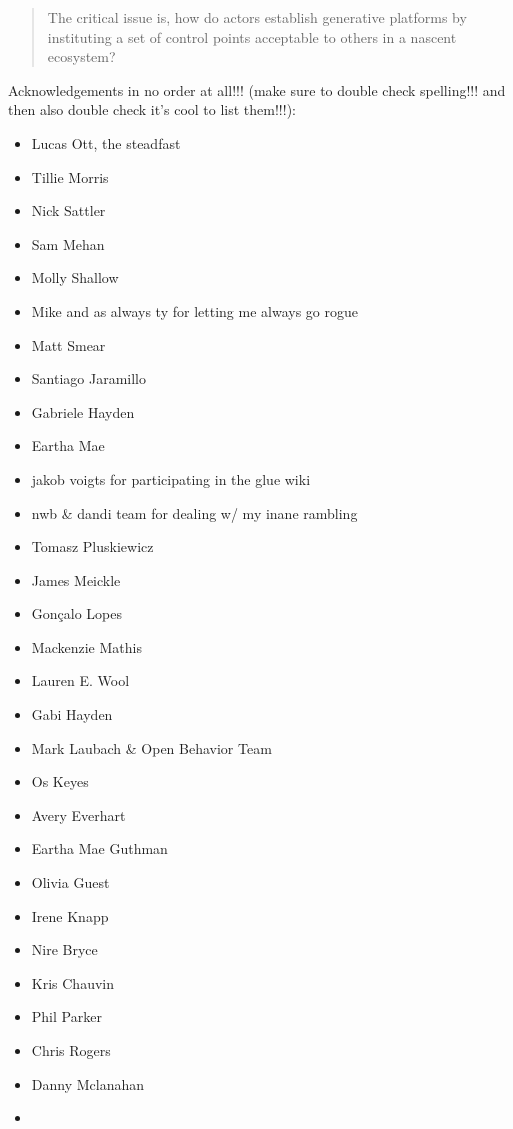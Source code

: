 \documentclass[10pt]{tufte-book}
\begin{document}
\begin{quote}
The critical issue is, how do actors establish generative platforms by
instituting a set of control points acceptable to others in a nascent
ecosystem? 
\end{quote}
\citep{tilsonDigitalInfrastructuresMissing2010} 

Acknowledgements in no order at all!!! (make sure to double check
spelling!!! and then also double check it's cool to list them!!!):

\begin{itemize}

\item
  Lucas Ott, the steadfast
\item
  Tillie Morris
\item
  Nick Sattler
\item
  Sam Mehan
\item
  Molly Shallow
\item
  Mike and as always ty for letting me always go rogue
\item
  Matt Smear
\item
  Santiago Jaramillo
\item
  Gabriele Hayden
\item
  Eartha Mae
\item
  jakob voigts for participating in the glue wiki
\item
  nwb \& dandi team for dealing w/ my inane rambling
\item
  Tomasz Pluskiewicz
\item
  James Meickle
\item
  Gonçalo Lopes
\item
  Mackenzie Mathis
\item
  Lauren E. Wool
\item
  Gabi Hayden
\item
  Mark Laubach \& Open Behavior Team
\item
  Os Keyes
\item
  Avery Everhart
\item
  Eartha Mae Guthman
\item
  Olivia Guest
\item
  Irene Knapp
\item
  Nire Bryce
\item
  Kris Chauvin
\item
  Phil Parker
\item
  Chris Rogers
\item
  Danny Mclanahan
\item

\end{itemize}
\end{document}
